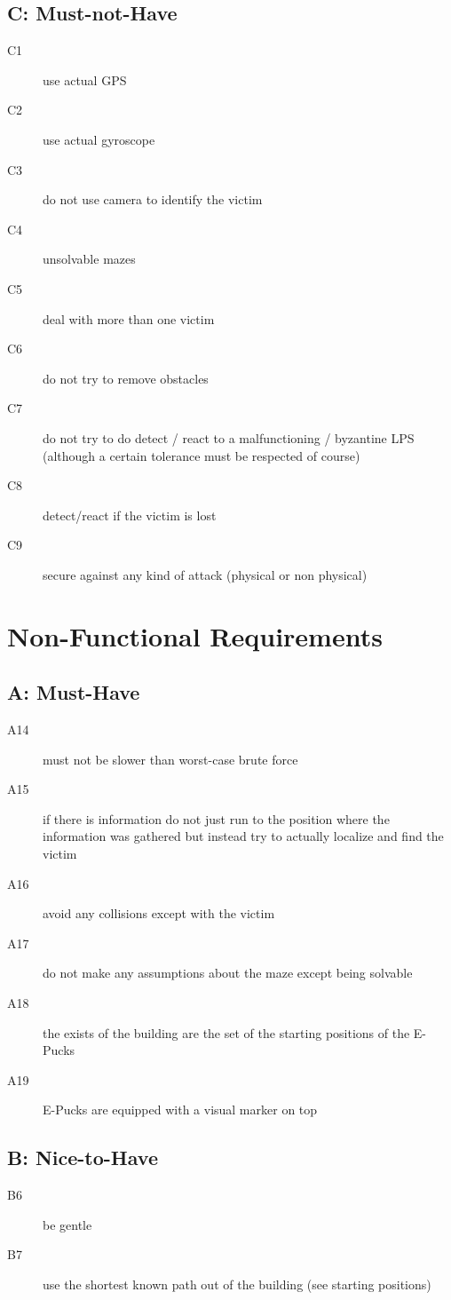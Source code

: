 \documentclass[a4paper,parskip,headheight=38pt]{scrartcl} %
\begin{document}
\subsection*{C: Must-not-Have}
\begin{description}
\item[C1] use actual GPS
\item[C2] use actual gyroscope
\item[C3] do not use camera to identify the victim
\item[C4] unsolvable mazes
\item[C5] deal with more than one victim
\item[C6] do not try to remove obstacles
\item[C7] do not try to do detect / react to a malfunctioning / byzantine LPS (although a certain tolerance must be respected of course)
\item[C8] detect/react if the victim is lost
\item[C9] secure against any kind of attack (physical or non physical)
\end{description}

\section{Non-Functional Requirements}
\subsection*{A: Must-Have}
\begin{description}
\item[A14] must not be slower than worst-case brute force
\item[A15] if there is information do not just run to the position where the information was gathered but instead try to actually localize and find the victim
\item[A16] avoid any collisions except with the victim
\item[A17] do not make any assumptions about the maze except being solvable
\item[A18] the exists of the building are the set of the starting positions of the E-Pucks
\item[A19] E-Pucks are equipped with a visual marker on top
\end{description}

\subsection*{B: Nice-to-Have}
\begin{description}
\item[B6] be gentle
\item[B7] use the shortest known path out of the building (see starting positions)
\end{description}
\end{document}
